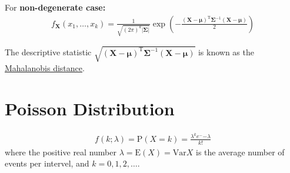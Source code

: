 \documentclass[10pt]{article}
\begin{document}
For \textbf{non-degenerate case:}
%
\begin{align}
  \label{eq:multi_norm_dist}
  f_{\mathbf{X}}(x_1, \ldots, x_k) = \frac{1}{\sqrt{{(2\pi)}^k |\boldsymbol\Sigma|}} \exp(- \frac{{(\mathbf{X} - \boldsymbol\mu)}^{\text{T}} \boldsymbol\Sigma^{-1} (\mathbf{X} - \boldsymbol\mu)}{2})
\end{align}

The descriptive statistic $\sqrt{{(\mathbf{X} - \boldsymbol\mu)}^{\text{T}} \boldsymbol\Sigma^{-1} (\mathbf{X} - \boldsymbol\mu)}$
is known as the \href{https://en.wikipedia.org/wiki/Mahalanobis_distance}{Mahalanobis distance}.


\section{Poisson Distribution}%
\label{sec:poisson}
\begin{align}
  \label{eq:poisson}
  f(k; \lambda) = \text{P}(X = k) = \frac{\lambda^k e^-{-\lambda}}{k!} 
\end{align}
%
where the positive real number $\lambda = \text{E}(X) = \text{Var}{X}$ is the
average number of events per intervel, and $k = 0, 1, 2, \ldots$.
\end{document}
